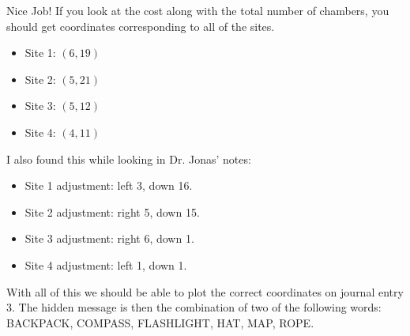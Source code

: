 Nice Job!
If you look at the cost along with the total number of chambers, you should get coordinates corresponding to all of the sites.
\begin{itemize}
        \item Site 1: \((6,19)\)
        \item Site 2: \((5,21)\)
        \item Site 3: \((5,12)\)
        \item Site 4: \((4, 11)\)
\end{itemize}
I also found this while looking in Dr. Jonas' notes:
\begin{itemize}
        \item Site 1 adjustment: left 3, down 16.
        \item Site 2 adjustment: right 5, down 15.
        \item Site 3 adjustment: right 6, down 1.
        \item Site 4 adjustment: left 1, down 1.
\end{itemize}

With all of this we should be able to plot the correct coordinates on journal entry 3. The hidden message is then the combination of two of the following words:
BACKPACK, COMPASS, FLASHLIGHT, HAT, MAP, ROPE.